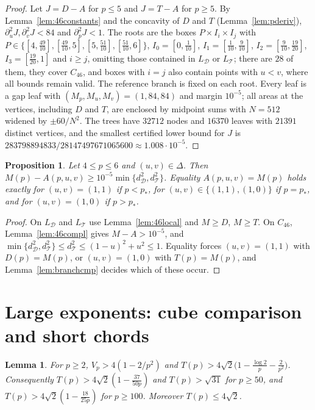 \documentclass[11pt]{amsart}
\newtheorem{proposition}[theorem]{Proposition}
\newtheorem{lemma}[theorem]{Lemma}
\theoremstyle{definition}
\theoremstyle{remark}
\numberwithin{equation}{section}
\newcommand{\cD}{\mathcal{D}}
\newcommand{\cT}{\mathcal{T}}
\begin{document}
\begin{proof}
Let $J=D-A$ for $p\le5$ and $J=T-A$ for $p\ge5$. By Lemma~\ref{lem:46constants} and the concavity of $D$ and $T$ (Lemma~\ref{lem:pderiv}), $\partial_u^2J,\partial_v^2J<84$ and $\partial_p^2J<1$. The roots are the boxes $P\times I_i\times I_j$ with $P\in\{[4,\frac{49}{10}],[\frac{49}{10},5],[5,\frac{51}{10}],[\frac{51}{10},6]\}$, $I_0=[0,\frac1{10}]$, $I_1=[\frac1{10},\frac9{10}]$, $I_2=[\frac9{10},\frac{19}{20}]$, $I_3=[\frac{19}{20},1]$ and $i\ge j$, omitting those contained in $L_\cD$ or $L_\cT$; there are $28$ of them, they cover $C_{46}$, and boxes with $i=j$ also contain points with $u<v$, where all bounds remain valid. The reference branch is fixed on each root. Every leaf is a gap leaf with $(M_p,M_u,M_v)=(1,84,84)$ and margin $10^{-5}$; all areas at the vertices, including $D$ and $T$, are enclosed by midpoint sums with $N=512$ widened by $\pm60/N^2$. The trees have $32712$ nodes and $16370$ leaves with $21391$ distinct vertices, and the smallest certified lower bound for $J$ is $283798894833/28147497671065600\approx1.008\cdot10^{-5}$.
\end{proof}

\begin{proposition}\label{prop:46}
Let $4\le p\le6$ and $(u,v)\in\Delta$. Then $M(p)-A(p,u,v)\ge10^{-5}\min\{d_\cD^2,d_\cT^2\}$. Equality $A(p,u,v)=M(p)$ holds exactly for $(u,v)=(1,1)$ if $p<p_*$, for $(u,v)\in\{(1,1),(1,0)\}$ if $p=p_*$, and for $(u,v)=(1,0)$ if $p>p_*$.
\end{proposition}

\begin{proof}
On $L_\cD$ and $L_\cT$ use Lemma~\ref{lem:46local} and $M\ge D$, $M\ge T$. On $C_{46}$, Lemma~\ref{lem:46compl} gives $M-A>10^{-5}$, and $\min\{d_\cD^2,d_\cT^2\}\le d_\cT^2\le(1-u)^2+u^2\le1$. Equality forces $(u,v)=(1,1)$ with $D(p)=M(p)$, or $(u,v)=(1,0)$ with $T(p)=M(p)$, and Lemma~\ref{lem:branchcmp} decides which of these occur.
\end{proof}

\section{Large exponents: cube comparison and short chords}\label{sec:chords}

\begin{lemma}\label{lem:Tlower}
For $p\ge2$, $V_p>4(1-2/p^2)$ and $T(p)>4\sqrt2\bigl(1-\frac{\log2}p-\frac2{p^2}\bigr)$. Consequently $T(p)>4\sqrt2(1-\frac{37}{50p})$ and $T(p)>\sqrt{31}$ for $p\ge50$, and $T(p)>4\sqrt2(1-\frac{18}{25p})$ for $p\ge100$. Moreover $T(p)\le4\sqrt2$.
\end{lemma}
\end{document}
